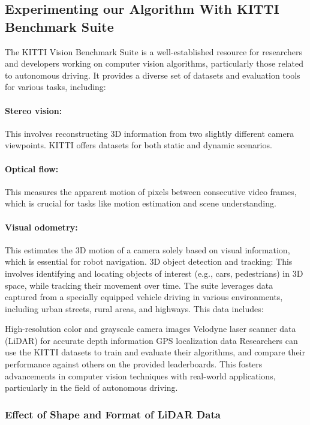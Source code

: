 \documentclass[conference]{IEEEtran}
\begin{document}
\subsection{Experimenting our Algorithm With KITTI Benchmark Suite}
The KITTI Vision Benchmark Suite is a well-established resource for researchers and developers working on computer vision algorithms, particularly those related to autonomous driving. It provides a diverse set of datasets and evaluation tools for various tasks, including:

\paragraph{Stereo vision:} This involves reconstructing 3D information from two slightly different camera viewpoints. KITTI offers datasets for both static and dynamic scenarios.
\paragraph{Optical flow:} This measures the apparent motion of pixels between consecutive video frames, which is crucial for tasks like motion estimation and scene understanding.
\paragraph{Visual odometry:} This estimates the 3D motion of a camera solely based on visual information, which is essential for robot navigation.
3D object detection and tracking: This involves identifying and locating objects of interest (e.g., cars, pedestrians) in 3D space, while tracking their movement over time.
The suite leverages data captured from a specially equipped vehicle driving in various environments, including urban streets, rural areas, and highways. This data includes:

High-resolution color and grayscale camera images
Velodyne laser scanner data (LiDAR) for accurate depth information
GPS localization data
Researchers can use the KITTI datasets to train and evaluate their algorithms, and compare their performance against others on the provided leaderboards. This fosters advancements in computer vision techniques with real-world applications, particularly in the field of autonomous driving.

\subsubsection{Effect of Shape and Format of LiDAR Data}
\end{document}
